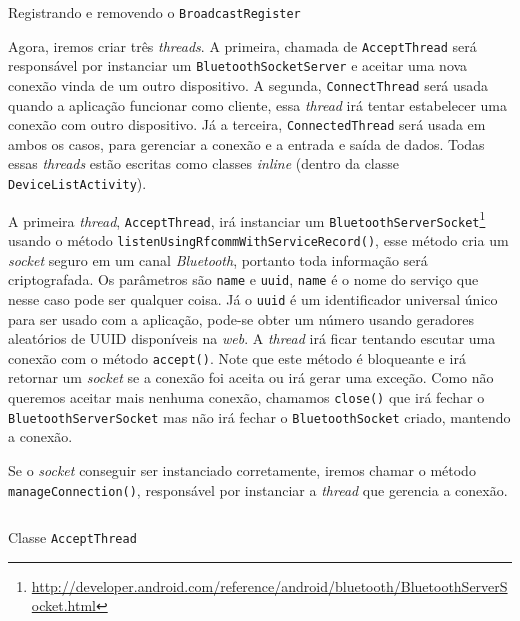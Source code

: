 \documentclass[a4paper,12pt,brazil,oneside]{book}
\begin{document}
	\begin{listing}[H]
	\inputminted[linenos=true,fontsize=\small,frame=lines, framesep=2mm, tabsize=2,numbersep=5pt]{java}{src/api/bluetooth/register.java}
	\caption{Registrando e removendo o \texttt{BroadcastRegister}}
	\label{code:bluetooth-registerbroadcast}
	\end{listing} 			

	Agora, iremos criar três \emph{threads}. A primeira, chamada de \texttt{AcceptThread} será responsável por instanciar um \texttt{BluetoothSocketServer} e aceitar uma nova conexão vinda de um outro dispositivo. A segunda, \texttt{ConnectThread} será usada quando a aplicação funcionar como cliente, essa \emph{thread} irá tentar estabelecer uma conexão com outro dispositivo. Já a terceira, \texttt{ConnectedThread} será usada em ambos os casos, para gerenciar a conexão e a entrada e saída de dados. Todas essas \emph{threads} estão escritas como classes \emph{inline} (dentro da classe \texttt{DeviceListActivity}).

	A primeira \emph{thread}, \texttt{AcceptThread}, irá instanciar um \texttt{BluetoothServerSocket}\footnote{\href{http://developer.android.com/reference/android/bluetooth/BluetoothServerSocket.html}{http://developer.android.com/reference/android/bluetooth/BluetoothServerSocket.html}}  usando o método \texttt{listenUsingRfcommWithServiceRecord()}, esse método cria um \emph{socket} seguro em um canal \emph{Bluetooth}, portanto toda informação será criptografada. Os parâmetros são \texttt{name} e \texttt{uuid}, \texttt{name} é o nome do serviço que nesse caso pode ser qualquer coisa. Já o \texttt{uuid} é um identificador universal único para ser usado com a aplicação, pode-se obter um número usando geradores aleatórios de UUID disponíveis na \emph{web}. A \emph{thread} irá ficar tentando escutar uma conexão com o método \texttt{accept()}. Note que este método é bloqueante e irá retornar um \emph{socket} se a conexão foi aceita ou irá gerar uma exceção.
Como não queremos aceitar mais nenhuma conexão, chamamos \texttt{close()} que irá fechar o \texttt{BluetoothServerSocket} mas não irá fechar o \texttt{BluetoothSocket} criado, mantendo a conexão.

Se o \emph{socket} conseguir ser instanciado corretamente, iremos chamar o método \\ \texttt{manageConnection()}, responsável por instanciar a \emph{thread} que gerencia a conexão. 

	\begin{listing}[H]
	\inputminted[linenos=true,fontsize=\small,frame=lines, framesep=2mm, tabsize=2,numbersep=5pt]{java}{src/api/bluetooth/acceptthread.java}
	\caption{Classe \texttt{AcceptThread}}
	\label{code:bluetooth-acceptthread}
	\end{listing} 			
\end{document}
